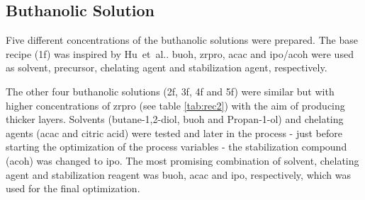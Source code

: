 \subsection{Buthanolic Solution}\label{sec:exp-sol-bu}
Five different concentrations of the buthanolic solutions were prepared.
The base recipe (\gls{1f}) was inspired by Hu~et~al.\cite{Hu2016}.
\Gls{buoh}, \gls{zrpro}, \gls{acac} and \gls{ipo}/\gls{acoh} were used as solvent, precursor, chelating agent and stabilization agent, respectively.

The other four buthanolic solutions (\gls{2f}, \gls{3f}, \gls{4f} and \gls{5f}) were similar 
but with higher concentrations of \gls{zrpro} (see table \ref{tab:rec2})
with the aim of producing thicker layers.
Solvents (butane-1,2-diol, \gls{buoh} and Propan-1-ol) and chelating agents 
(\gls{acac} and citric acid) were tested and later in the process - just before 
starting the optimization of the process variables
- the stabilization compound (\gls{acoh}) was changed to \gls{ipo}.
The most promising combination of solvent, chelating agent and stabilization reagent was 
\gls{buoh}, \gls{acac} and \gls{ipo}, respectively, which was used for the final optimization.

